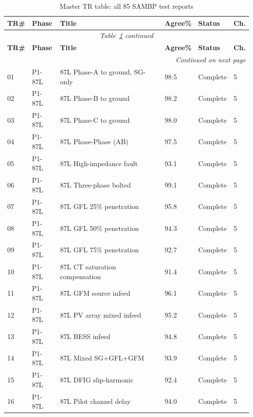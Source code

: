 \documentclass[11pt,a4paper]{report}
\newcommand{\cmark}{\ding{51}}
\begin{document}
\small
\begin{longtable}{@{}p{0.7cm}p{1.2cm}p{4.5cm}p{1.3cm}p{1.5cm}p{1.0cm}@{}}
\caption{Master TR table: all 85 SAMBP test reports}\label{tab:master_tr}\\
\toprule
\textbf{TR\#} & \textbf{Phase} & \textbf{Title} & \textbf{Agree\%} & \textbf{Status} & \textbf{Ch.} \\
\midrule
\endfirsthead
\multicolumn{6}{c}{\small\itshape Table~\ref{tab:master_tr} continued}\\
\toprule
\textbf{TR\#} & \textbf{Phase} & \textbf{Title} & \textbf{Agree\%} & \textbf{Status} & \textbf{Ch.} \\
\midrule
\endhead
\midrule
\multicolumn{6}{r}{\small\itshape Continued on next page}\\
\endfoot
\bottomrule
\endlastfoot
01 & P1-87L & 87L Phase-A to ground, SG-only & 98.5 & \cmark Complete & 5 \\
02 & P1-87L & 87L Phase-B to ground & 98.2 & \cmark Complete & 5 \\
03 & P1-87L & 87L Phase-C to ground & 98.0 & \cmark Complete & 5 \\
04 & P1-87L & 87L Phase-Phase (AB) & 97.5 & \cmark Complete & 5 \\
05 & P1-87L & 87L High-impedance fault & 93.1 & \cmark Complete & 5 \\
06 & P1-87L & 87L Three-phase bolted & 99.1 & \cmark Complete & 5 \\
07 & P1-87L & 87L GFL 25\% penetration & 95.8 & \cmark Complete & 5 \\
08 & P1-87L & 87L GFL 50\% penetration & 94.3 & \cmark Complete & 5 \\
09 & P1-87L & 87L GFL 75\% penetration & 92.7 & \cmark Complete & 5 \\
10 & P1-87L & 87L CT saturation compensation & 91.4 & \cmark Complete & 5 \\
11 & P1-87L & 87L GFM source infeed & 96.1 & \cmark Complete & 5 \\
12 & P1-87L & 87L PV array mixed infeed & 95.2 & \cmark Complete & 5 \\
13 & P1-87L & 87L BESS infeed & 94.8 & \cmark Complete & 5 \\
14 & P1-87L & 87L Mixed SG+GFL+GFM & 93.9 & \cmark Complete & 5 \\
15 & P1-87L & 87L DFIG slip-harmonic & 92.4 & \cmark Complete & 5 \\
16 & P1-87L & 87L Pilot channel delay & 94.0 & \cmark Complete & 5 \\

\end{longtable}
\end{document}
